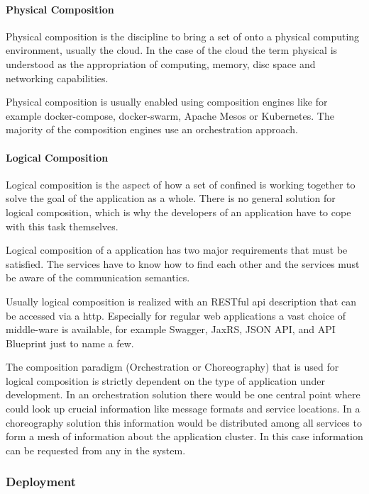 \paragraph{Physical Composition}

Physical composition is the discipline to bring a set of \mss{} onto a
physical computing environment, usually the cloud. In the case of the cloud the
term physical is understood as the appropriation of computing, memory, disc
space and networking capabilities.

Physical composition is usually enabled using composition engines like for
example docker-compose, docker-swarm, Apache Mesos or Kubernetes. The majority
of the composition engines use an orchestration approach. 

\paragraph{Logical Composition}

Logical composition is the aspect of how a set of confined \mss{} is working
together to solve the goal of the application as a whole. There is no
general solution for logical composition, which is why the developers of an
application have to cope with this task themselves.

Logical composition of a \ms{} application has two major requirements that must
be satisfied. The services have to know how to find each other and the services
must be aware of the communication semantics. 

Usually logical composition is realized with an RESTful \gls{api} description
that can be accessed via a \gls{http}. Especially for regular web applications a
vast choice of middle-ware is available, for example Swagger, JaxRS, JSON API,
and API Blueprint just to name a few.

The composition paradigm (Orchestration or Choreography) that is used for
logical composition is strictly dependent on the type of application under
development. In an orchestration solution there would be one central point where
\mss{} could look up crucial information like message formats and service
locations. In a choreography solution this information would be distributed
among all services to form a mesh of information about the application cluster.
In this case information can be requested from any \ms{} in the system.

\subsubsection{\ms{} Deployment}

